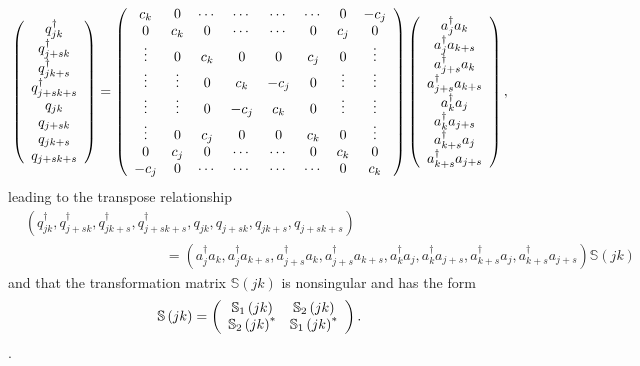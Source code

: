 \documentclass[titlepage]{article}%
\begin{document}
\begin{equation}
\left(
\begin{array}
[c]{c}%
q_{jk}^{\dagger}\\
q_{j+sk}^{\dagger}\\
q_{jk+s}^{\dagger}\\
q_{j+sk+s}^{\dagger}\\
q_{jk}\\
q_{j+sk}\\
q_{jk+s}\\
q_{j+sk+s}%
\end{array}
\right)  =\left(
\begin{array}
[c]{cccccccc}%
c_{k} & 0 & \cdots & \cdots & \cdots & \cdots & 0 & -c_{j}\\
0 & c_{k} & 0 & \cdots & \cdots & 0 & c_{j} & 0\\
\vdots & 0 & c_{k} & 0 & 0 & c_{j} & 0 & \vdots\\
\vdots & \vdots & 0 & c_{k} & -c_{j} & 0 & \vdots & \vdots\\
\vdots & \vdots & 0 & -c_{j} & c_{k} & 0 & \vdots & \vdots\\
\vdots & 0 & c_{j} & 0 & 0 & c_{k} & 0 & \vdots\\
0 & c_{j} & 0 & \cdots & \cdots & 0 & c_{k} & 0\\
-c_{j} & 0 & \cdots & \cdots & \cdots & \cdots & 0 & c_{k}%
\end{array}
\right)  \left(
\begin{array}
[c]{c}%
a_{j}^{\dagger}a_{k}\\
a_{j}^{\dagger}a_{k+s}\\
a_{j+s}^{\dagger}a_{k}\\
a_{j+s}^{\dagger}a_{k+s}\\
a_{k}^{\dagger}a_{j}\\
a_{k}^{\dagger}a_{j+s}\\
a_{k+s}^{\dagger}a_{j}\\
a_{k+s}^{\dagger}a_{j+s}%
\end{array}
\right)  ,
\end{equation}
leading to the transpose relationship
\begin{align}
&  \left(  q_{jk}^{\dagger},q_{j+sk}^{\dagger},q_{jk+s}^{\dagger}%
,q_{j+sk+s}^{\dagger},q_{jk},q_{j+sk},q_{jk+s},q_{j+sk+s}\right) \nonumber\\
&  \qquad\qquad\qquad\qquad\qquad\left.  =\right.  \left(  a_{j}^{\dagger
}a_{k},a_{j}^{\dagger}a_{k+s},a_{j+s}^{\dagger}a_{k},a_{j+s}^{\dagger}%
a_{k+s},a_{k}^{\dagger}a_{j},a_{k}^{\dagger}a_{j+s},a_{k+s}^{\dagger}%
a_{j},a_{k+s}^{\dagger}a_{j+s}\right)  \mathbb{S}\left(  jk\right)
\end{align}
and that the transformation matrix $\mathbb{S}\left(  jk\right)  $ is
nonsingular and has the form
\begin{equation}
\mathbb{S}\left(  jk\right)  =\left(
\begin{array}
[c]{cc}%
\mathbb{S}_{1}\left(  jk\right)  & \mathbb{S}_{2}\left(  jk\right) \\
\mathbb{S}_{2}\left(  jk\right)  ^{\ast} & \mathbb{S}_{1}\left(  jk\right)
^{\ast}%
\end{array}
\right)  .
\end{equation}
.
\end{document}
